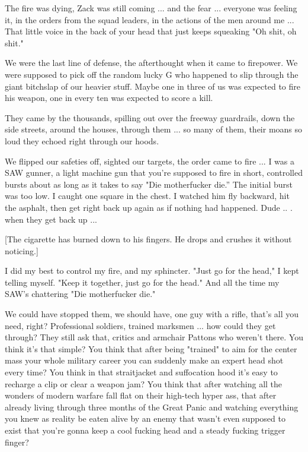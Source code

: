 \documentclass[10pt,a5paper,twoside]{book}
\begin{document}
The fire was dying, Zack was still coming ... and the fear ... everyone was feeling it, in the orders from the squad leaders, in the actions of the men around me ... That little voice in the back of your head that just keeps squeaking "Oh shit, oh shit."

We were the last line of defense, the afterthought when it came to firepower. We were supposed to pick off the random lucky G who happened to slip through the giant bitchslap of our heavier stuff. Maybe one in three of us was expected to fire his weapon, one in every ten was expected to score a kill.

They came by the thousands, spilling out over the freeway guardrails, down the side streets, around the houses, through them ... so many of them, their moans so loud they echoed right through our hoods.

We flipped our safeties off, sighted our targets, the order came to fire ... I was a SAW gunner, a light machine gun that you're supposed to fire in short, controlled bursts about as long as it takes to say "Die motherfucker die.” The initial burst was too low. I caught one square in the chest. I watched him fly backward, hit the asphalt, then get right back up again as if nothing had happened. Dude .. . when they get back up ...

[The cigarette has burned down to his fingers. He drops and crushes it without noticing.]

I did my best to control my fire, and my sphincter. "Just go for the head," I kept telling myself. "Keep it together, just go for the head." And all the time my SAW's chattering "Die motherfucker die."

We could have stopped them, we should have, one guy with a rifle, that's all you need, right? Professional soldiers, trained marksmen ... how could they get through? They still ask that, critics and armchair Pattons who weren't there. You think it's that simple? You think that after being "trained" to aim for the center mass your whole military career you can suddenly make an expert head shot every time? You think in that straitjacket and suffocation hood it's easy to recharge a clip or clear a weapon jam? You think that after watching all the wonders of modern warfare fall flat on their high-tech hyper ass, that after already living through three months of the Great Panic and watching everything you knew as reality be eaten alive by an enemy that wasn't even supposed to exist that you're gonna keep a cool fucking head and a steady fucking trigger finger?
\end{document}
